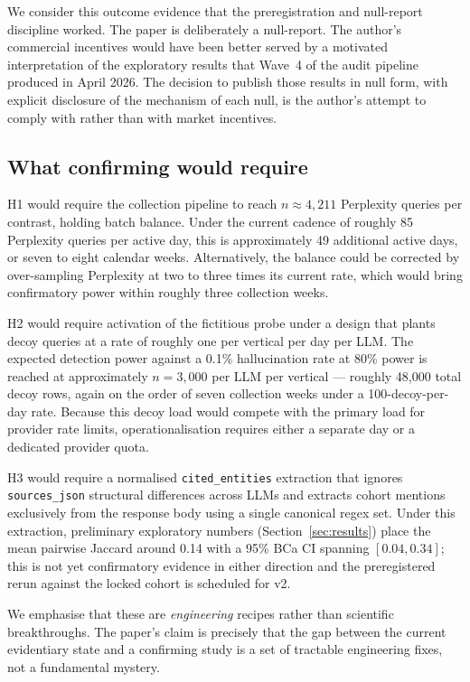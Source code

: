\documentclass[preprint,12pt,authoryear]{elsarticle}
\begin{document}
We consider this outcome evidence that the preregistration and null-report discipline worked. The paper is deliberately a null-report. The author's commercial incentives would have been better served by a motivated interpretation of the exploratory results that Wave~4 of the audit pipeline produced in April 2026. The decision to publish those results in null form, with explicit disclosure of the mechanism of each null, is the author's attempt to comply with \citet{Munafo2017} rather than with market incentives.

\subsection{What confirming would require}
H1 would require the collection pipeline to reach $n\approx 4{,}211$ Perplexity queries per contrast, holding batch balance. Under the current cadence of roughly 85 Perplexity queries per active day, this is approximately 49 additional active days, or seven to eight calendar weeks. Alternatively, the balance could be corrected by over-sampling Perplexity at two to three times its current rate, which would bring confirmatory power within roughly three collection weeks.

H2 would require activation of the fictitious probe under a design that plants decoy queries at a rate of roughly one per vertical per day per LLM. The expected detection power against a 0.1\% hallucination rate at 80\% power is reached at approximately $n=3{,}000$ per LLM per vertical --- roughly 48{,}000 total decoy rows, again on the order of seven collection weeks under a 100-decoy-per-day rate. Because this decoy load would compete with the primary load for provider rate limits, operationalisation requires either a separate day or a dedicated provider quota.

H3 would require a normalised \texttt{cited\_entities} extraction that ignores \texttt{sources\_json} structural differences across LLMs and extracts cohort mentions exclusively from the response body using a single canonical regex set. Under this extraction, preliminary exploratory numbers (Section~\ref{sec:results}) place the mean pairwise Jaccard around 0.14 with a 95\% BCa CI spanning $[0.04, 0.34]$; this is not yet confirmatory evidence in either direction and the preregistered rerun against the locked cohort is scheduled for v2.

We emphasise that these are \emph{engineering} recipes rather than scientific breakthroughs. The paper's claim is precisely that the gap between the current evidentiary state and a confirming study is a set of tractable engineering fixes, not a fundamental mystery.
\end{document}
